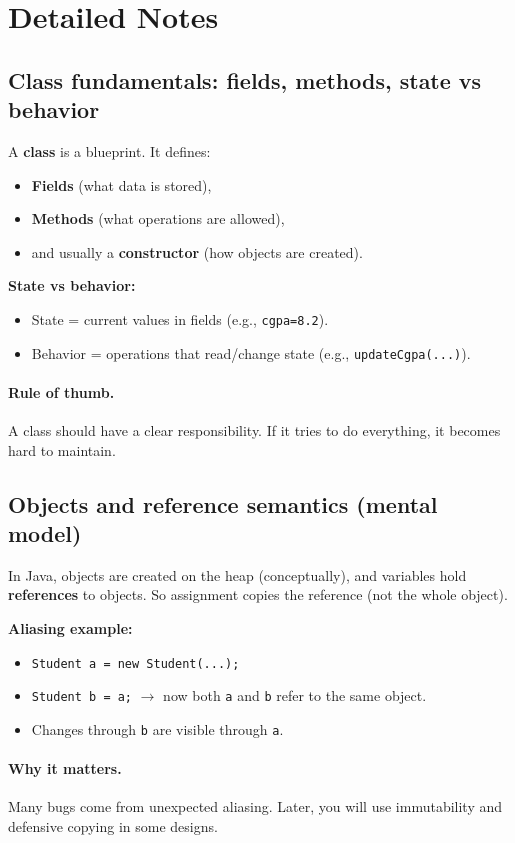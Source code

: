 \documentclass[11pt]{article}
\begin{document}
\section{Detailed Notes}
\subsection{Class fundamentals: fields, methods, state vs behavior}
A \textbf{class} is a blueprint. It defines:
\begin{itemize}
  \item \textbf{Fields} (what data is stored),
  \item \textbf{Methods} (what operations are allowed),
  \item and usually a \textbf{constructor} (how objects are created).
\end{itemize}

\textbf{State vs behavior:}
\begin{itemize}
  \item State = current values in fields (e.g., \texttt{cgpa=8.2}).
  \item Behavior = operations that read/change state (e.g., \texttt{updateCgpa(...)}).
\end{itemize}

\paragraph{Rule of thumb.} A class should have a clear responsibility. If it tries to do everything, it becomes hard to maintain.

\subsection{Objects and reference semantics (mental model)}
In Java, objects are created on the heap (conceptually), and variables hold \textbf{references} to objects.
So assignment copies the reference (not the whole object).

\textbf{Aliasing example:}
\begin{itemize}
  \item \texttt{Student a = new Student(...);}
  \item \texttt{Student b = a;} $\rightarrow$ now both \texttt{a} and \texttt{b} refer to the same object.
  \item Changes through \texttt{b} are visible through \texttt{a}.
\end{itemize}

\paragraph{Why it matters.} Many bugs come from unexpected aliasing. Later, you will use immutability and defensive copying in some designs.
\end{document}
